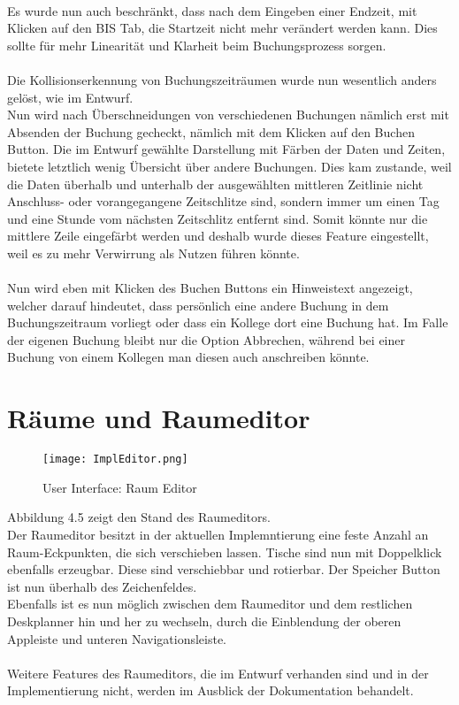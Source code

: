 \paragraph{}
Es wurde nun auch beschränkt, dass nach dem Eingeben einer Endzeit, mit Klicken auf den BIS Tab, die Startzeit nicht mehr verändert werden kann.
Dies sollte für mehr Linearität und Klarheit beim Buchungsprozess sorgen.

\paragraph{}
Die Kollisionserkennung von Buchungszeiträumen wurde nun wesentlich anders gelöst, wie im Entwurf.
\\
Nun wird nach Überschneidungen von verschiedenen Buchungen nämlich erst mit Absenden der Buchung gecheckt, nämlich mit dem Klicken auf den Buchen Button.
Die im Entwurf gewählte Darstellung mit Färben der Daten und Zeiten, bietete letztlich wenig Übersicht über andere Buchungen.
Dies kam zustande, weil die Daten überhalb und unterhalb der ausgewählten mittleren Zeitlinie nicht Anschluss- oder vorangegangene Zeitschlitze sind,
sondern immer um einen Tag und eine Stunde vom nächsten Zeitschlitz entfernt sind. 
Somit könnte nur die mittlere Zeile eingefärbt werden und deshalb wurde dieses Feature eingestellt, weil es zu mehr Verwirrung als Nutzen führen könnte.
\paragraph{}
Nun wird eben mit Klicken des Buchen Buttons ein Hinweistext angezeigt, welcher darauf hindeutet, dass persönlich eine andere Buchung in dem Buchungszeitraum vorliegt oder dass ein Kollege dort eine Buchung hat.
Im Falle der eigenen Buchung bleibt nur die Option Abbrechen, während bei einer Buchung von einem Kollegen man diesen auch anschreiben könnte.

\newpage
\section{Räume und Raumeditor}

\begin{figure}[!h]
  \centering
  \texttt{[image: ImplEditor.png]}
  \caption{User Interface: Raum Editor}
  \label{fig:UI_Editor}
\end{figure}

Abbildung 4.5 zeigt den Stand des Raumeditors. 
\\
Der Raumeditor besitzt in der aktuellen Implemntierung eine feste Anzahl an Raum-Eckpunkten, die sich verschieben lassen.
Tische sind nun mit Doppelklick ebenfalls erzeugbar. Diese sind verschiebbar und rotierbar. 
Der Speicher Button ist nun überhalb des Zeichenfeldes. 
\\
Ebenfalls ist es nun möglich zwischen dem Raumeditor und dem restlichen Deskplanner hin und her zu wechseln, durch die Einblendung der oberen Appleiste und unteren Navigationsleiste.
\\\\
Weitere Features des Raumeditors, die im Entwurf verhanden sind und in der Implementierung nicht, werden im Ausblick der Dokumentation behandelt.


